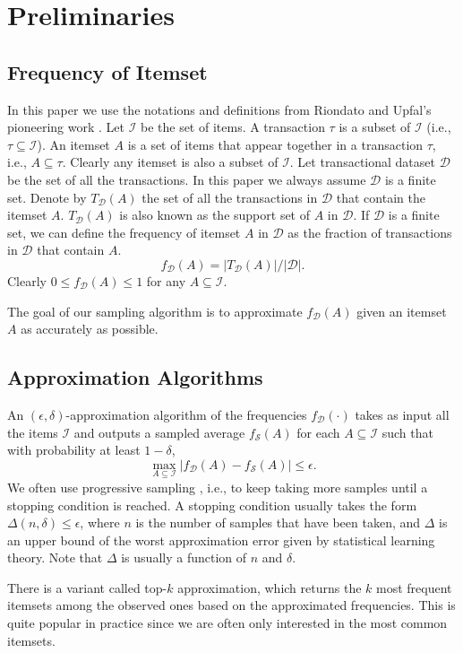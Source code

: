 \documentclass{article}
\begin{document}
\section{Preliminaries}
\subsection{Frequency of Itemset}
\newcommand{\I}{\mathcal{I}}
\newcommand{\D}{\mathcal{D}}
In this paper we use the notations and definitions from Riondato and Upfal's pioneering work \cite{RU15}. 
Let $\I$ be the set of items. A transaction $\tau$ is a subset of $\I$ (i.e., $\tau \subseteq \I$).
An itemset $A$ is a set of items that appear together in a transaction $\tau$, i.e., $A \subseteq \tau$. Clearly any itemset is also a subset of $\I$. 
Let transactional dataset $\D$ be the set of all the transactions. In this paper we always assume $\D$ is a finite set. Denote by $T_\D(A)$ the set of all the transactions in $\D$ that contain the itemset $A$. $T_\D(A)$ is also known as the support set of $A$ in $\D$.
If $\D$ is a finite set, we can define the frequency of itemset $A$ in $\D$ as the fraction of transactions in $\D$ that contain $A$.
$$f_\D(A) = |T_\D(A)|/|\D|.$$
Clearly $0 \leq f_\D(A) \leq 1$ for any $A \subseteq \I$.

The goal of our sampling algorithm is to approximate $f_\D(A)$ given an itemset $A$ as accurately as possible.

\subsection{Approximation Algorithms}
\newcommand{\Smp}{\mathcal{S}}
An $(\epsilon,\delta)$-approximation algorithm of the frequencies $f_\D(\cdot)$ takes as input all the items $\I$ and outputs a sampled average $f_\Smp(A)$ for each $A\subseteq\I$ such that with probability at least $1-\delta$,
$$\max_{A\subseteq\I}|f_\D(A) - f_\Smp(A)| \leq \epsilon.$$
We often use progressive sampling \cite{RU15,RU16}, i.e., to keep taking more samples until a stopping condition is reached. A stopping condition usually takes the form $\Delta(n, \delta) \leq \epsilon$, where $n$ is the number of samples that have been taken, and $\Delta$ is an upper bound of the worst approximation error given by statistical learning theory. Note that $\Delta$ is usually a function of $n$ and $\delta$.

There is a variant called top-$k$ approximation, which returns the $k$ most frequent itemsets among the observed ones based on the approximated frequencies. This is quite popular in practice since we are often only interested in the most common itemsets. 
\end{document}

